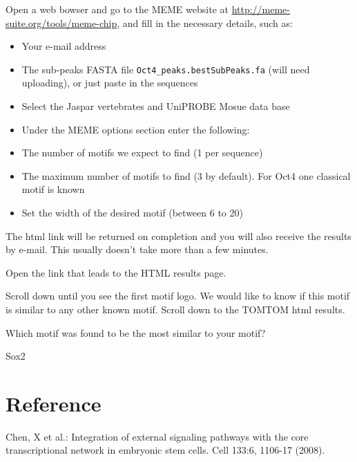 \begin{steps}
Open a web bowser and go to the MEME website at
\url{http://meme-suite.org/tools/meme-chip}, and fill in the necessary
details, such as:
\begin{itemize}
	\item Your e-mail address 
	\item The sub-peaks FASTA file \texttt{Oct4\_peaks.bestSubPeaks.fa} (will need uploading), or just paste in the sequences 
	\item Select the Jaspar vertebrates and UniPROBE Mosue data base
	\item Under the MEME options section enter the following:
	\item The number of motifs we expect to find (1 per sequence) 
	\item The maximum number of motifs to find (3 by default). For Oct4 one classical motif is known 
	\item Set the width of the desired motif (between 6 to 20)
\end{itemize}
\end{steps}

\begin{note}
The html link will be returned on completion and you will also receive the results by e-mail. This usually doesn't take more than a few minutes.
\end{note}

\begin{steps}
Open the link that leads to the HTML results page.

Scroll down until you see the first motif logo. We would like to know if this
motif is similar to any other known motif. Scroll down to the TOMTOM html results.
\end{steps}


\begin{questions}
Which motif was found to be the most similar to your motif?
\begin{answer}
Sox2
\end{answer}
\end{questions}

\newpage
\section{Reference}
Chen, X et al.: Integration of external signaling pathways with the core transcriptional network in embryonic stem cells. Cell 133:6, 1106-17 (2008).
